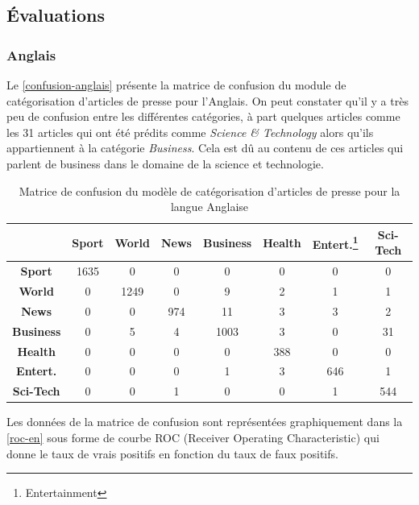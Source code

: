 \subsection{Évaluations}
    \subsubsection{Anglais}
    Le \autoref{confusion-anglais} présente la matrice de confusion du module de catégorisation d'articles de presse pour l'Anglais. On peut constater qu'il y a très peu de confusion entre les différentes catégories, à part quelques articles comme les 31 articles qui ont été prédits comme \emph{Science \& Technology} alors qu'ils appartiennent à la catégorie \emph{Business}. Cela est dû au contenu de ces articles qui parlent de business dans le domaine de la science et technologie. 
    \begin{table}[H]
        \begin{center}
            \begin{tabular}{|c|c|c|c|c|c|c|c|}
                \cline{2-8}
                \multicolumn{1}{c|}{} & \textbf{Sport} &  \textbf{World} &  \textbf{News} &  \textbf{Business} &  \textbf{Health} & \textbf{Entert.\footnote{Entertainment}} &  \textbf{Sci-Tech} \\
                \hline
                \textbf{Sport} & 1635 & 0 & 0 & 0 & 0 & 0 & 0 \\
                \textbf{World}  & 0 & 1249 & 0 & 9 & 2 & 1 & 1 \\
                \textbf{News}  & 0 & 0 & 974 & 11 & 3 & 3 & 2 \\
                \textbf{Business}  & 0 & 5 & 4 & 1003 & 3 & 0 & 31 \\
                \textbf{Health}  & 0 & 0 & 0 & 0 & 388 & 0 & 0 \\
                \textbf{Entert.}  & 0 & 0 & 0 & 1 & 3 & 646 & 1 \\
                \textbf{Sci-Tech}  & 0 & 0 & 1 & 0 & 0 & 1 & 544 \\
                \hline
            \end{tabular}
        \end{center}
        \caption{Matrice de confusion du modèle de catégorisation d'articles de presse pour la langue Anglaise}
        \label{confusion-anglais}
    \end{table}
   Les données de la matrice de confusion sont représentées graphiquement dans la \autoref{roc-en} sous forme de courbe ROC (Receiver Operating Characteristic) qui donne le taux de vrais positifs en fonction du taux de faux positifs.
